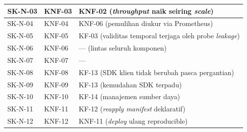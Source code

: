 {\begin{longtable}{|>{\centering\arraybackslash}m{1.6cm}|>{\centering\arraybackslash}m{2.2cm}|m{8.6cm}|}
\hline
SK-N-03 & KNF-03 & KNF-02 (\textit{throughput} naik seiring \textit{scale}) \\
\hline
SK-N-04 & KNF-04 & KNF-06 (pemulihan diukur via Prometheus) \\
\hline
SK-N-05 & KNF-05 & KF-03 (validitas temporal terjaga oleh probe \textit{leakage}) \\
\hline
SK-N-06 & KNF-06 & --- (lintas seluruh komponen) \\
\hline
SK-N-07 & KNF-07 & --- \\
\hline
SK-N-08 & KNF-08 & KF-13 (SDK klien tidak berubah pasca pergantian) \\
\hline
SK-N-09 & KNF-09 & KF-13 (kemudahan SDK terpadu) \\
\hline
SK-N-10 & KNF-10 & KF-14 (manajemen sumber daya) \\
\hline
SK-N-11 & KNF-11 & KF-12 (\textit{reapply manifest} deklaratif) \\
\hline
SK-N-12 & KNF-12 & KNF-11 (\textit{deploy} ulang reproducible) \\
\hline
\end{longtable}
}
